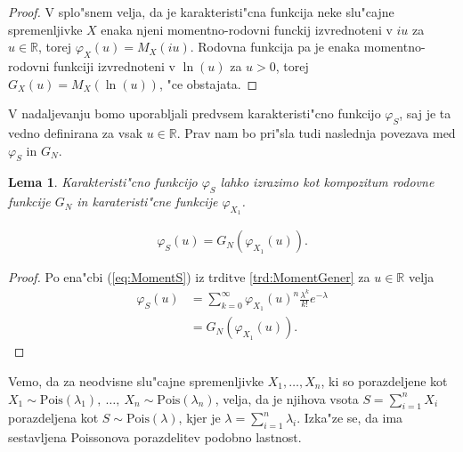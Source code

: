\documentclass[12pt, a4paper, reqno]{amsart}
\theoremstyle{definition}
\theoremstyle{plain}
\newtheorem{lema}[definicija]{Lema}
\newcommand{\R}{\mathbb{R}}
\newcommand{\1}{\mathds{1}}
\newcommand{\Pois}[1]{\text{Pois}(#1)}
\begin{document}
    \begin{proof}
    V splo"snem velja, da je karakteristi"cna funkcija neke slu"cajne spremenljivke $X$ enaka
    njeni momentno-rodovni funckij izvrednoteni v $iu$ za $u\in\R$, torej $\varphi_X(u) = M_X(iu)$. Rodovna funkcija
    pa je enaka momentno-rodovni funkciji izvrednoteni v $\ln(u)$ za $u>0$, torej 
    $G_X(u) = M_X\left(\ln(u)\right)$, "ce obstajata.
    \end{proof}

    V nadaljevanju bomo uporabljali predvsem karakteristi"cno funkcijo $\varphi_S$, saj je ta vedno definirana 
    za vsak $u\in\R$. Prav nam bo pri"sla tudi naslednja povezava med $\varphi_S$ in $G_N$. 

    \begin{lema}
        Karakteristi"cno funkcijo $\varphi_S$ lahko izrazimo kot kompozitum rodovne funkcije $G_N$ in 
        karateristi"cne funkcije $\varphi_{X_1}$.

        \begin{align*}
            \varphi_{S}(u) = G_{N}\left(\varphi_{X_1}(u)\right).
        \end{align*}

        \label{lema:povezavaRodovneKarkateristicne}
    \end{lema}

    \begin{proof}
        Po ena"cbi (\ref{eq:MomentS}) iz trditve \ref{trd:MomentGener} za $u\in\R$ velja
        \begin{align*}
            \varphi_{S}(u) &= \sum_{k=0}^{\infty}
            \varphi_{X_1}(u)^n\frac{\lambda^k}{k!}e^{-\lambda} \\
            &= G_{N}\left(\varphi_{X_1}(u)\right).
        \end{align*}
    \end{proof}

    Vemo, da za neodvisne slu"cajne spremenljivke $X_1,  \dots, X_n$, ki so porazdeljene 
    kot $X_1\sim\Pois{\lambda_1}, \ \dots, \ X_n\sim\Pois{\lambda_n}$, 
    velja, da je njihova vsota $S = \sum_{i=1}^nX_i$ porazdeljena kot $S\sim\Pois{\lambda}$, kjer je
    $\lambda = \sum_{i=1}^n\lambda_i$.
    Izka"ze se, da ima sestavljena Poissonova porazdelitev 
    podobno lastnost.
\end{document}
